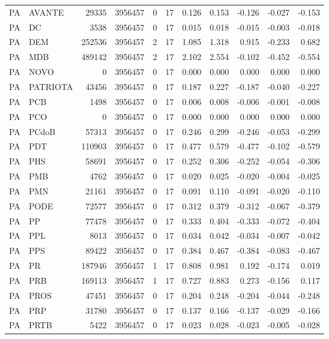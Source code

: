 \begin{landscape}
\begin{longtable}{llrrrrrrrrr}
PA & AVANTE & 29335 & 3956457 & 0 & 17 & 0.126 & 0.153 & -0.126 & -0.027 & -0.153 \\
PA & DC & 3538 & 3956457 & 0 & 17 & 0.015 & 0.018 & -0.015 & -0.003 & -0.018 \\
PA & DEM & 252536 & 3956457 & 2 & 17 & 1.085 & 1.318 & 0.915 & -0.233 & 0.682 \\
PA & MDB & 489142 & 3956457 & 2 & 17 & 2.102 & 2.554 & -0.102 & -0.452 & -0.554 \\
PA & NOVO & 0 & 3956457 & 0 & 17 & 0.000 & 0.000 & 0.000 & 0.000 & 0.000 \\
PA & PATRIOTA & 43456 & 3956457 & 0 & 17 & 0.187 & 0.227 & -0.187 & -0.040 & -0.227 \\
PA & PCB & 1498 & 3956457 & 0 & 17 & 0.006 & 0.008 & -0.006 & -0.001 & -0.008 \\
PA & PCO & 0 & 3956457 & 0 & 17 & 0.000 & 0.000 & 0.000 & 0.000 & 0.000 \\
PA & PCdoB & 57313 & 3956457 & 0 & 17 & 0.246 & 0.299 & -0.246 & -0.053 & -0.299 \\
PA & PDT & 110903 & 3956457 & 0 & 17 & 0.477 & 0.579 & -0.477 & -0.102 & -0.579 \\
PA & PHS & 58691 & 3956457 & 0 & 17 & 0.252 & 0.306 & -0.252 & -0.054 & -0.306 \\
PA & PMB & 4762 & 3956457 & 0 & 17 & 0.020 & 0.025 & -0.020 & -0.004 & -0.025 \\
PA & PMN & 21161 & 3956457 & 0 & 17 & 0.091 & 0.110 & -0.091 & -0.020 & -0.110 \\
PA & PODE & 72577 & 3956457 & 0 & 17 & 0.312 & 0.379 & -0.312 & -0.067 & -0.379 \\
PA & PP & 77478 & 3956457 & 0 & 17 & 0.333 & 0.404 & -0.333 & -0.072 & -0.404 \\
PA & PPL & 8013 & 3956457 & 0 & 17 & 0.034 & 0.042 & -0.034 & -0.007 & -0.042 \\
PA & PPS & 89422 & 3956457 & 0 & 17 & 0.384 & 0.467 & -0.384 & -0.083 & -0.467 \\
PA & PR & 187946 & 3956457 & 1 & 17 & 0.808 & 0.981 & 0.192 & -0.174 & 0.019 \\
PA & PRB & 169113 & 3956457 & 1 & 17 & 0.727 & 0.883 & 0.273 & -0.156 & 0.117 \\
PA & PROS & 47451 & 3956457 & 0 & 17 & 0.204 & 0.248 & -0.204 & -0.044 & -0.248 \\
PA & PRP & 31780 & 3956457 & 0 & 17 & 0.137 & 0.166 & -0.137 & -0.029 & -0.166 \\
PA & PRTB & 5422 & 3956457 & 0 & 17 & 0.023 & 0.028 & -0.023 & -0.005 & -0.028 \\

\end{longtable}
\end{landscape}
